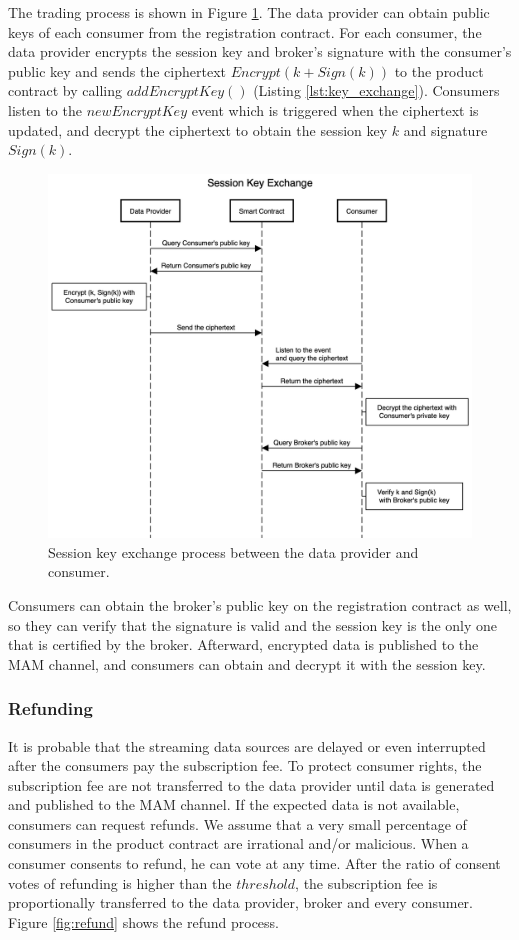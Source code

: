 \documentclass[journal,article,applsci,submit,moreauthors,pdftex]{Definitions/mdpi}
\begin{document}
The trading process is shown in Figure \ref{fig:key_exchange}. The data provider can obtain public keys of each consumer from the registration contract. For each consumer, the data provider encrypts the session key and broker's signature with the consumer's public key and sends the ciphertext $Encrypt(k + Sign(k))$ to the product contract by calling $addEncryptKey()$ (Listing \ref{lst:key_exchange}). Consumers listen to the $newEncryptKey$ event which is triggered when the ciphertext is updated, and decrypt the ciphertext to obtain the session key $k$ and signature $Sign(k)$.

\begin{figure}[H]
    \centering
    \includegraphics[width=5.5 in]{key_exchange}
    \caption{Session key exchange process between the data provider and consumer.}
    \label{fig:key_exchange}
\end{figure}

Consumers can obtain the broker's public key on the registration contract as well, so they can verify that the signature is valid and the session key is the only one that is certified by the broker. Afterward, encrypted data is published to the MAM channel, and consumers can obtain and decrypt it with the session key.

\subsubsection{Refunding}

It is probable that the streaming data sources are delayed or even interrupted after the consumers pay the subscription fee. To protect consumer rights, the subscription fee are not transferred to the data provider until data is generated and published to the MAM channel. If the expected data is not available, consumers can request refunds. We assume that a very small percentage of consumers in the product contract are irrational and/or malicious. When a consumer consents to refund, he can vote at any time. After the ratio of consent votes of refunding is higher than the $threshold$, the subscription fee is proportionally transferred to the data provider, broker and every consumer. Figure \ref{fig:refund} shows the refund process.
\end{document}
